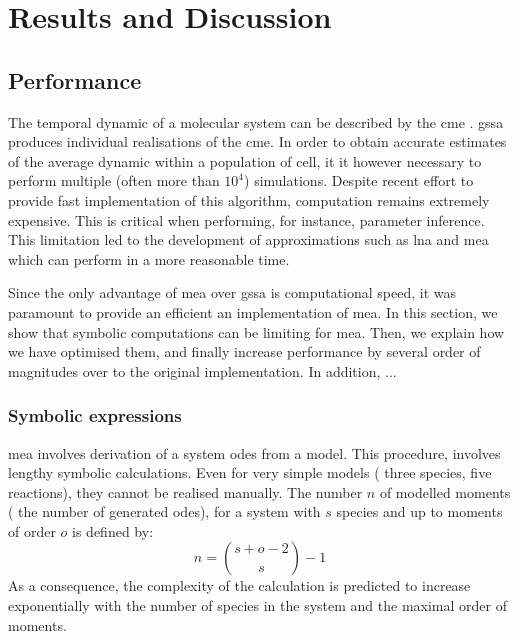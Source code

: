 \section{Results and Discussion} \label{results}


\subsection{Performance}\label{performance}
The temporal dynamic of a molecular system can be described by the \gls{cme} .
\gls{gssa}\cite{gillespie_general_1976} produces individual realisations of the \gls{cme}.
In order to obtain accurate estimates of the average dynamic within a population of cell, it it however necessary to perform multiple (often more than $10^4$) simulations.
Despite recent effort \cite{niemi_efficient_2011,dittamo_optimized_2009,komarov_accelerating_2012} to provide fast implementation of this algorithm, computation remains extremely expensive.
This is critical when performing, for instance, parameter inference.
This limitation led to the development of approximations such as \gls{lna}\cite{komorowski_bayesian_2009} and \gls{mea}\cite{ale_general_2013} which can perform in a more reasonable time.

Since the only advantage of \gls{mea} over \gls{gssa} is computational speed, it was paramount to provide an efficient an implementation of \gls{mea}.
In this section, we show that symbolic computations can be limiting for \gls{mea}.
Then, we explain how we have optimised them, and finally increase performance by several order of magnitudes over to the original \mat{} implementation.
In addition, ...\\


\subsubsection{Symbolic expressions}


\gls{mea} involves derivation of a system \gls{ode}s from a model.
This procedure\cite{ale_general_2013}, involves lengthy symbolic calculations.
Even for very simple models (\eg{} three species, five reactions), they cannot be realised manually.
The number $n$ of modelled moments (\ie{} the number of generated \gls{ode}s), for a system with $s$ species and up to moments of order $o$ is defined by:\\
\begin{equation}
n={{s+o-2} \choose {s}} -1
\end{equation}
As a consequence, the complexity of the calculation is predicted to increase exponentially with the number of species in the system and the maximal order of moments.

